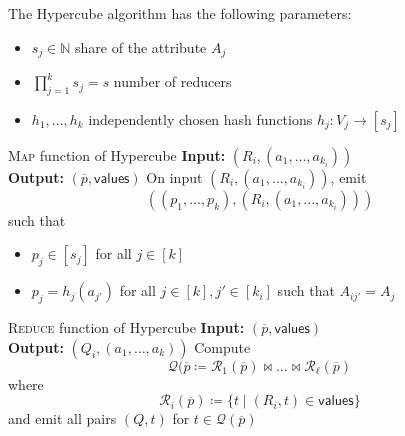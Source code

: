 \documentclass[english]{panikzettel}
\begin{document}
The Hypercube algorithm has the following parameters:

\begin{itemize}
	\item $s_j \in \mathbb{N}$ share of the attribute $A_j$
	\item $\prod_{j=1}^k s_j = s$ number of reducers
	\item $h_1, \ldots, h_k$ independently chosen hash functions $h_j : V_j \rightarrow [s_j]$
\end{itemize}

\begin{halfboxl}
\vspace{-\baselineskip}

\begin{algo}{\textsc{Map} function of Hypercube}
\textbf{Input:} $(R_i, (a_1, \ldots, a_{k_i}))$ \\
\textbf{Output:} $(\overline{p}, \textsf{values})$
\tcblower
On input $(R_i, (a_1, \ldots, a_{k_i}))$, emit
\[
((p_1,...,p_k),(R_i,(a_1,...,a_{k_i})))
\]
such that
\begin{itemize}
	\item $p_j\in [s_j]$ for all $j\in [k]$
	\item $p_j=h_j(a_{j'})$ for all $j\in [k],j'\in [k_i]$ such that $A_{ij'}=A_j$
\end{itemize}
\end{algo}

\begin{algo}{\textsc{Reduce} function of Hypercube}
\textbf{Input:} $(\overline{p}, \textsf{values})$ \\
\textbf{Output:} $(Q_i, (a_1, \ldots, a_k))$
\tcblower
Compute
\[
\mathcal{Q}(\overline{p}\coloneqq \mathcal{R}_1(\overline{p})\bowtie \ldots \bowtie \mathcal{R}_\ell (\overline{p})
\]
where
\[
\mathcal{R}_i(\overline{p})\coloneqq \{t\mid (R_i, t)\in \textsf{values} \}
\]
and emit all pairs $(Q,t)$ for $t\in \mathcal{Q}(\overline{p})$
\end{algo}

\end{halfboxl}%
\end{document}
